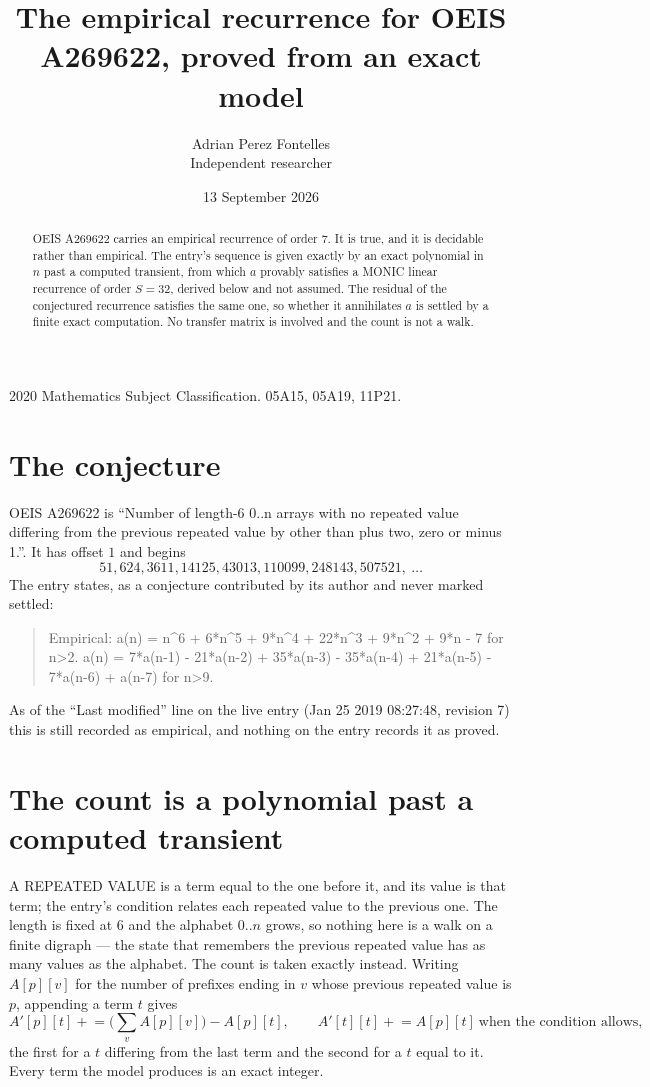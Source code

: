 \documentclass[11pt,a4paper]{article}
\title{The empirical recurrence for OEIS A269622, proved from an exact model}
\author{Adrian Perez Fontelles\\ \small Independent researcher}
\date{13 September 2026}
\theoremstyle{plain}
\theoremstyle{definition}
\begin{document}
\maketitle

\begin{abstract}
OEIS A269622 carries an empirical recurrence of order $7$. It is true, and it is
decidable rather than empirical. The entry's sequence is given exactly by an exact polynomial in $n$ past a computed transient, from
which $a$ provably satisfies a MONIC linear recurrence of order $S=32$, derived below and not
assumed. The residual of the conjectured recurrence satisfies the same one, so whether it
annihilates $a$ is settled by a finite exact computation. No transfer matrix is involved and
the count is not a walk.
\end{abstract}

\noindent\small 2020 Mathematics Subject Classification. 05A15, 05A19, 11P21.\normalsize

\section{The conjecture}

OEIS A269622 is ``Number of length-6 0..n arrays with no repeated value differing from the previous repeated value by other than plus two, zero or minus 1.''. It has offset $1$ and begins
\[
51, 624, 3611, 14125, 43013, 110099, 248143, 507521,\ \dots
\]
The entry states, as a conjecture contributed by its author and never marked settled:
\begin{quote}
Empirical: a(n) = n\^{}6 + 6*n\^{}5 + 9*n\^{}4 + 22*n\^{}3 + 9*n\^{}2 + 9*n - 7 for n>2. a(n) = 7*a(n-1) - 21*a(n-2) + 35*a(n-3) - 35*a(n-4) + 21*a(n-5) - 7*a(n-6) + a(n-7) for n>9.
\end{quote}
As of the ``Last modified'' line on the live entry (Jan 25 2019 08:27:48, revision 7)
this is still recorded as empirical, and nothing on the entry records it as proved.

\section{The count is a polynomial past a computed transient}

A REPEATED VALUE is a term equal to the one before it, and its value is that term; the entry's
condition relates each repeated value to the previous one. The length is fixed at $6$ and the
alphabet $0..n$ grows, so nothing here is a walk on a finite digraph --- the state that
remembers the previous repeated value has as many values as the alphabet. The count is taken
exactly instead. Writing $A[p][v]$ for the number of prefixes ending in $v$ whose previous
repeated value is $p$, appending a term $t$ gives
\[
A'[p][t] \mathrel{+}= \Big(\sum_v A[p][v]\Big) - A[p][t],
\qquad
A'[t][t] \mathrel{+}= A[p][t]\ \text{when the condition allows},
\]
the first for a $t$ differing from the last term and the second for a $t$ equal to it. Every
term the model produces is an exact integer.
\end{document}
